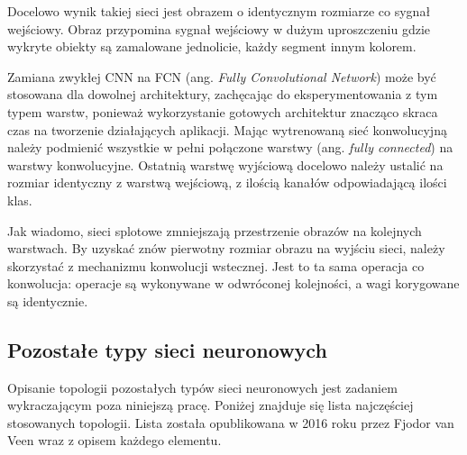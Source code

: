 \documentclass[12pt,a4paper,twoside,titlepage,openright]{book}
\begin{document}
\begin{itemize}
Docelowo wynik takiej sieci jest obrazem o identycznym rozmiarze co sygnał wejściowy. Obraz przypomina sygnał wejściowy w dużym uproszczeniu gdzie wykryte obiekty są zamalowane jednolicie, każdy segment innym kolorem.

Zamiana zwykłej CNN na FCN (ang. \textit{Fully Convolutional Network}) może być stosowana dla dowolnej architektury, zachęcając do eksperymentowania z tym typem warstw, ponieważ wykorzystanie gotowych architektur znacząco skraca czas na tworzenie działających aplikacji. Mając wytrenowaną sieć konwolucyjną należy podmienić wszystkie w pełni połączone warstwy (ang. \textit{fully connected}) na warstwy konwolucyjne. Ostatnią warstwę wyjściową docelowo należy ustalić na rozmiar identyczny z warstwą wejściową, z ilością kanałów odpowiadającą ilości klas.

Jak wiadomo, sieci splotowe zmniejszają przestrzenie obrazów na kolejnych warstwach. By uzyskać znów pierwotny rozmiar obrazu na wyjściu sieci, należy skorzystać z mechanizmu konwolucji wstecznej. Jest to ta sama operacja co konwolucja: operacje są wykonywane w odwróconej kolejności, a wagi korygowane są identycznie.\cite{DBLP:journals/corr/LongSD14}

\subsection{Pozostałe typy sieci neuronowych}
Opisanie topologii pozostałych typów sieci neuronowych jest zadaniem wykraczającym poza niniejszą pracę. Poniżej znajduje się lista najczęściej stosowanych topologii. Lista została opublikowana w 2016 roku przez Fjodor van Veen wraz z opisem każdego elementu.\cite{siteFjodorList}


\end{itemize}
\end{document}
